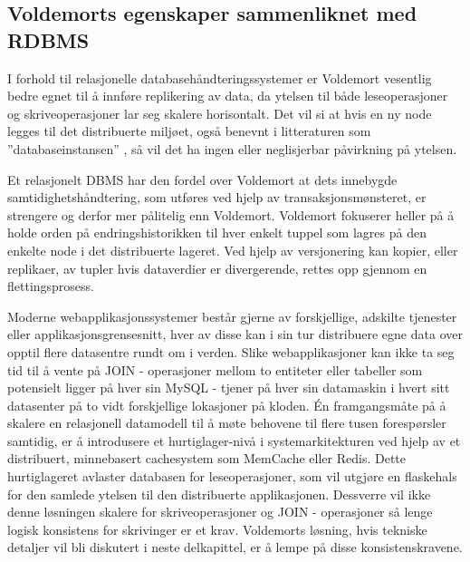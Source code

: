 
\subsection{Voldemorts egenskaper sammenliknet med RDBMS}
I forhold til relasjonelle databasehåndteringssystemer er Voldemort vesentlig bedre egnet til å innføre replikering av data, da ytelsen til både leseoperasjoner og skriveoperasjoner lar seg skalere horisontalt. Det vil si at hvis en ny node legges til det distribuerte miljøet, også benevnt i litteraturen som ''databaseinstansen'' \citep{sadalage2013}, så vil det ha ingen eller neglisjerbar påvirkning på ytelsen. 

Et relasjonelt DBMS har den fordel over Voldemort at dets innebygde samtidighetshånd\-tering, som utføres ved hjelp av transaksjonsmønsteret, er strengere og derfor mer pålitelig enn Voldemort. Voldemort fokuserer heller på å holde orden på endringshistorikken til hver enkelt tuppel som lagres på den enkelte node i det distribuerte lageret. Ved hjelp av versjonering kan kopier, eller replikaer, av tupler hvis dataverdier er divergerende, rettes opp gjennom en flettingsprosess.

Moderne webapplikasjonssystemer består gjerne av forskjellige, adskilte tjenester eller applikasjonsgrensesnitt, hver av disse kan i sin tur distribuere egne data over opptil flere datasentre rundt om i verden. Slike webapplikasjoner kan ikke ta seg tid til å vente på JOIN - operasjoner mellom to entiteter eller tabeller som potensielt ligger på hver sin MySQL - tjener på hver sin datamaskin i hvert sitt datasenter på to vidt forskjellige lokasjoner på kloden. Én framgangsmåte på å skalere en relasjonell datamodell til å møte behovene til flere tusen forespørsler samtidig, er å introdusere et hurtiglager-nivå i systemarkitekturen ved hjelp av et distribuert, minnebasert cachesystem som MemCache eller Redis. Dette hurtiglageret avlaster databasen for leseoperasjoner, som vil utgjøre en flaskehals for den samlede ytelsen til den distribuerte applikasjonen. Dessverre vil ikke denne løsningen skalere for skriveoperasjoner og JOIN - operasjoner så lenge logisk konsistens for skrivinger er et krav. Voldemorts løsning, hvis tekniske detaljer vil bli diskutert i neste delkapittel, er å lempe på disse konsistenskravene.

